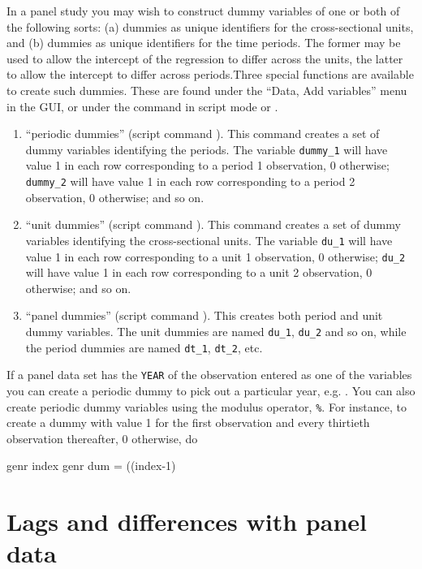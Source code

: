 In a panel study you may wish to construct dummy variables of one or
both of the following sorts: (a) dummies as unique identifiers for the
cross-sectional units, and (b) dummies as unique identifiers for the
time periods.  The former may be used to allow the intercept of the
regression to differ across the units, the latter to allow the
intercept to differ across periods.Three special functions are
available to create such dummies.  These are found under the ``Data,
Add variables'' menu in the GUI, or under the  command in
script mode or .
\begin{enumerate}
\item ``periodic dummies'' (script command ).  This
  command creates a set of dummy variables identifying the periods.
  The variable \verb+dummy_1+ will have value 1 in each row
  corresponding to a period 1 observation, 0 otherwise; \verb+dummy_2+
  will have value 1 in each row corresponding to a period 2
  observation, 0 otherwise; and so on.
\item ``unit dummies'' (script command ).  This
  command creates a set of dummy variables identifying the
  cross-sectional units.  The variable \verb+du_1+ will have value 1
  in each row corresponding to a unit 1 observation, 0 otherwise;
  \verb+du_2+ will have value 1 in each row corresponding to a unit 2
  observation, 0 otherwise; and so on.
\item ``panel dummies'' (script command ).  This
  creates both period and unit dummy variables. The unit dummies are
  named \verb+du_1+, \verb+du_2+ and so on, while the period dummies
  are named \verb+dt_1+, \verb+dt_2+, etc.
\end{enumerate}

If a panel data set has the \verb+YEAR+ of the observation entered as
one of the variables you can create a periodic dummy to pick out a
particular year, e.g. .  You can also
create periodic dummy variables using the modulus operator,
\verb+%+.  For instance, to create a dummy with
value 1 for the first observation and every thirtieth observation
thereafter, 0 otherwise, do
\begin{code}
      genr index 
      genr dum = ((index-1)%
\end{code}


\section{Lags and differences with panel data}
\label{panel-lagged}

